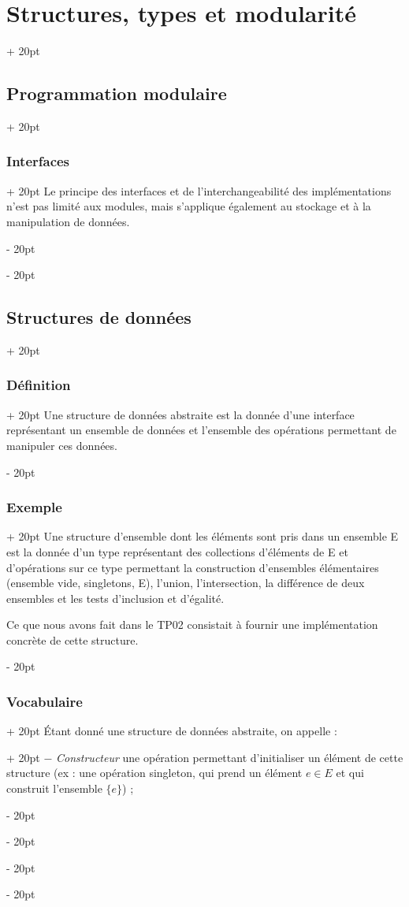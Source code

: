 \documentclass[a4paper, 12pt, twoside]{article}
\newcommand{\ind}[1][20pt]{\advance\leftskip + #1}
\newcommand{\deind}[1][20pt]{\advance\leftskip - #1}
\newenvironment{indt}[2][20pt]{#2 \par \ind[#1]}{\par \deind} %
\begin{document}
\begin{indt}{\section{Structures, types et modularité}}
\begin{indt}{\subsection{Programmation modulaire}}
\begin{indt}{\subsubsection{Interfaces}}
                Le principe des interfaces et de l’interchangeabilité des implémentations n’est pas limité aux modules, mais s’applique également au stockage et à la manipulation de données.
            \end{indt}
            
        \end{indt}
            
        \begin{indt}{\subsection{Structures de données}}
            
            \begin{indt}{\subsubsection{Définition}}
                Une structure de données abstraite est la donnée d’une interface représentant un ensemble de données et l’ensemble des opérations permettant de manipuler ces données.
            \end{indt}
            
            \begin{indt}{\subsubsection{Exemple}}
                Une structure d’ensemble dont les éléments sont pris dans un ensemble E est la donnée d’un type représentant des collections d’éléments de E et d’opérations sur ce type permettant la construction d’ensembles élémentaires (ensemble vide, singletons, E), l’union, l’intersection, la différence de deux ensembles et les tests d’inclusion et d’égalité.
                
                Ce que nous avons fait dans le TP02 consistait à fournir une implémentation concrète de cette structure.
            \end{indt}
            
            \begin{indt}{\subsubsection{Vocabulaire}}
                \begin{indt}{Étant donné une structure de données abstraite, on appelle :}
                    $-$ \textit{Constructeur} une opération permettant d’initialiser un élément de cette structure (ex : une opération singleton, qui prend un élément $e \in E$ et qui construit l’ensemble $\{e\}$) ;
                    

\end{indt}
\end{indt}
\end{indt}
\end{indt}
\end{document}
